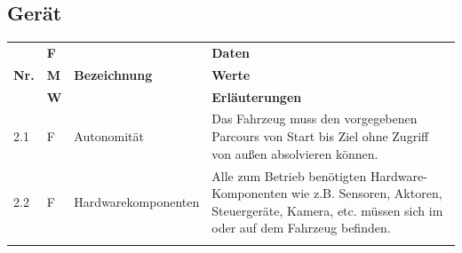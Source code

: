 \documentclass[../main.tex]{subfiles}
\begin{document}
\subsection{Gerät}
\begin{tabular}{|l|p{0.5cm}|p{4cm}|p{10cm}|}
  \hline
               & \textbf{F}            &                                                                       & \textbf{Daten}                                                                                                                                                                                                                                                                                                                             \\
  \textbf{Nr.} & \textbf{M}            & \textbf{Bezeichnung}                                                  & \textbf{Werte}                                                                                                                                                                                                                                                                                                                             \\
               & \textbf{W}            &                                                                       & \textbf{Erläuterungen}                                                                                                                                                                                                                                                                                                                     \\
  \hline
  2.1          & F                     & Autonomität                                                           & Das Fahrzeug muss den vorgegebenen Parcours von Start bis Ziel ohne Zugriff von außen absolvieren können.                                                                                                                                                                                                                                  \\
  \hline
  2.2          & F                     & Hardwarekomponenten                                                   & Alle zum Betrieb benötigten Hardware-Komponenten wie z.B. Sensoren, Aktoren, Steuergeräte, Kamera, etc. müssen sich im oder auf dem Fahrzeug befinden.                                                                                                                                                                                     \\                                                                                                                                                                                                                                                                                                                                           \\

\end{tabular}
\end{document}
